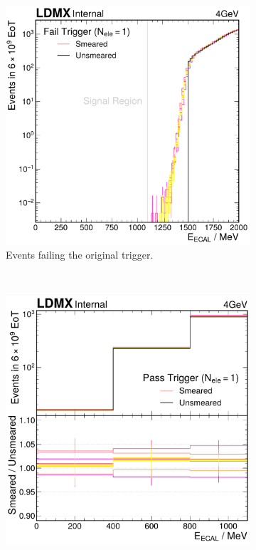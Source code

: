 \begin{figure}
  \centering
  \begin{subfigure}[t]{0.49\textwidth}
    \centering
    \includegraphics[width=\textwidth]{figures/ldmx/analysis/systematics/4gev-fail-trigger-uncorrcell.pdf}
    \caption{Events failing the original trigger.}
    \label{fig:4gev-smeared-unsmeared-comp:fail-trigger}
  \end{subfigure}%
  ~
  \begin{subfigure}[t]{0.49\textwidth}
    \centering
    \includegraphics[width=\textwidth]{figures/ldmx/analysis/systematics/4gev-pass-trigger-ana-bins-uncorrcell.pdf}

\end{subfigure}
\end{figure}
